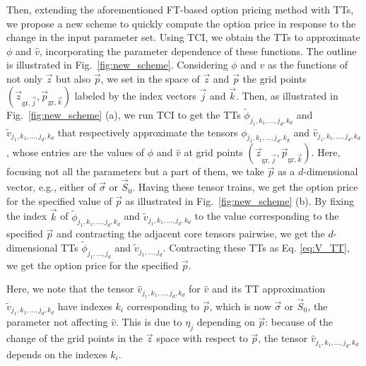 Then, extending the aforementioned FT-based option pricing method with TTs, we propose a new scheme to quickly compute the option price in response to the change in the input parameter set.
Using TCI, we obtain the TTs to approximate $\phi$ and $\hat{v}$, incorporating the parameter dependence of these functions.
The outline is illustrated in Fig.~\ref{fig:new_scheme}.
Considering $\phi$ and $\hat{v}$ as the functions of not only $\vec{z}$ but also $\vec{p}$, we set in the space of $\vec{z}$ and $\vec{p}$ the grid points $(\vec{z}_{\mathrm{gr},\vec{j}},\vec{p}_{\mathrm{gr},\vec{k}})$ labeled by the index vectors $\vec{j}$ and $\vec{k}$.
Then, as illustrated in Fig.~\ref{fig:new_scheme} (a), we run TCI to get the TTs $\tilde{\phi}_{j_1,k_1,\ldots,j_d,k_d}$ and $\tilde{v}_{j_1,k_1,\ldots,j_d,k_d}$ that respectively approximate the tensors $\phi_{j_1,k_1,\ldots,j_d,k_d}$ and $\hat{v}_{j_1,k_1,\ldots,j_d,k_d}$, whose entries are the values of $\phi$ and $\hat{v}$ at grid points $(\vec{z}_{\mathrm{gr},\vec{j}},\vec{p}_{\mathrm{gr},\vec{k}})$.
Here, focusing not all the parameters but a part of them, we take $\vec{p}$ as a $d$-dimensional vector, e.g., either of $\vec{\sigma}$ or $\vec{S}_0$.
Having these tensor trains, we get the option price for the specified value of $\vec{p}$ as illustrated in Fig.~\ref{fig:new_scheme} (b).
By fixing the index $\vec{k}$ of $\tilde{\phi}_{j_1,k_1,\ldots,j_d,k_d}$ and $\tilde{v}_{j_1,k_1,\ldots,j_d,k_d}$ to the value corresponding to the specified $\vec{p}$ and contracting the adjacent core tensors pairwise, we get the $d$-dimensional TTs $\tilde{\phi}_{j_1,\ldots,j_d}$ and $\tilde{v}_{j_1,\ldots,j_d}$.
Contracting these TTs as Eq. \eqref{eq:V_TT}, we get the option price for the specified $\vec{p}$.



Here, we note that the tensor $\hat{v}_{j_1,k_1,\ldots,j_d,k_d}$ for $\hat{v}$ and its TT approximation $\tilde{v}_{j_1,k_1,\ldots,j_d,k_d}$ have indexes $k_i$ corresponding to $\vec{p}$, which is now $\vec{\sigma}$ or $\vec{S}_0$, the parameter not affecting $\hat{v}$.
This is due to $\eta_j$ depending on $\vec{p}$: because of the change of the grid points in the $\vec{z}$ space with respect to $\vec{p}$, the tensor $\hat{v}_{j_1,k_1,\ldots,j_d,k_d}$ depends on the indexes $k_i$.

